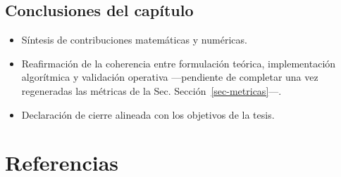 \documentclass[
  spanish,
  letterpaper,
]{scrreprt}
\providecommand{\tightlist}{%
  \setlength{\itemsep}{0pt}\setlength{\parskip}{0pt}}
\theoremstyle{definition}
\theoremstyle{remark}
\begin{document}
\section{Conclusiones del capítulo}\label{conclusiones-del-capuxedtulo}

\begin{itemize}
\tightlist
\item
  Síntesis de contribuciones matemáticas y numéricas.
\item
  Reafirmación de la coherencia entre formulación teórica,
  implementación algorítmica y validación operativa ---pendiente de
  completar una vez regeneradas las métricas de la Sec.
  Sección~\ref{sec-metricas}---.
\item
  Declaración de cierre alineada con los objetivos de la tesis.
\end{itemize}


\chapter{}\label{section}


\chapter{}\label{section-1}


\chapter*{Referencias}\label{referencias}

\end{document}
